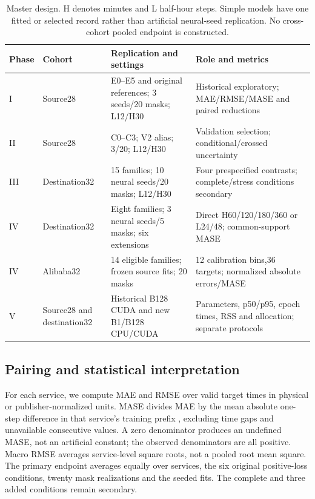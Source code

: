 \begin{table}[!t]
\caption{Master design. H denotes minutes and L half-hour steps. Simple models have one fitted or selected record rather than artificial neural-seed replication. No cross-cohort pooled endpoint is constructed.}\label{tab:master}
\centering\footnotesize
\begin{tabularx}{\linewidth}{p{.15\linewidth}p{.17\linewidth}p{.23\linewidth}X}
\toprule Phase & Cohort & Replication and settings & Role and metrics \\\midrule
I & Source28 & E0--E5 and original references; 3 seeds/20 masks; L12/H30 & Historical exploratory; MAE/RMSE/MASE and paired reductions \\
II & Source28 & C0--C3; V2 alias; 3/20; L12/H30 & Validation selection; conditional/crossed uncertainty \\
III & Destination32 & 15 families; 10 neural seeds/20 masks; L12/H30 & Four prespecified contrasts; complete/stress conditions secondary \\
IV & Destination32 & Eight families; 3 neural seeds/5 masks; six extensions & Direct H60/120/180/360 or L24/48; common-support MASE \\
IV & Alibaba32 & 14 eligible families; frozen source fits; 20 masks & 12 calibration bins,36 targets; normalized absolute errors/MASE \\
V & Source28 and destination32 & Historical B128 CUDA and new B1/B128 CPU/CUDA & Parameters, p50/p95, epoch times, RSS and allocation; separate protocols \\
\bottomrule
\end{tabularx}
\end{table}


\subsection{Pairing and statistical interpretation}
For each service, we compute MAE and RMSE over valid target times in physical or publisher-normalized units. MASE divides MAE by the mean absolute one-step difference in that service's training prefix \cite{mase}, excluding time gaps and unavailable consecutive values. A zero denominator produces an undefined MASE, not an artificial constant; the observed denominators are all positive. Macro RMSE averages service-level square roots, not a pooled root mean square. The primary endpoint averages equally over services, the six original positive-loss conditions, twenty mask realizations and the seeded fits. The complete and three added conditions remain secondary.

